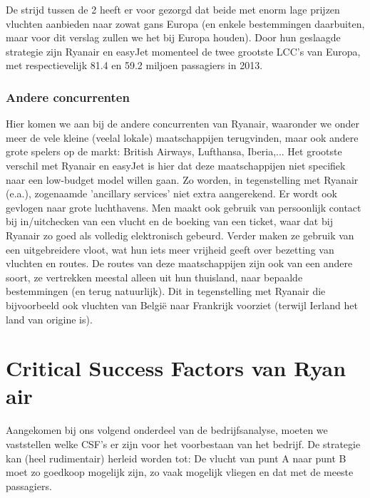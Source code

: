 \documentclass{article}
\begin{document}
De strijd tussen de 2 heeft er voor gezorgd dat beide met enorm lage prijzen vluchten aanbieden naar zowat gans Europa (en enkele bestemmingen daarbuiten, maar voor dit verslag zullen we het bij Europa houden). Door hun geslaagde strategie zijn Ryanair en easyJet momenteel de twee grootste LCC's van Europa, met respectievelijk 81.4 en 59.2 miljoen passagiers in 2013.

\section{Andere concurrenten}

Hier komen we aan bij de andere concurrenten van Ryanair, waaronder we onder meer de vele kleine (veelal lokale) maatschappijen terugvinden, maar ook andere grote spelers op de markt: British Airways, Lufthansa, Iberia,... 
Het grootste verschil met Ryanair en easyJet is hier dat deze maatschappijen niet specifiek naar een low-budget model willen gaan. Zo worden, in tegenstelling met Ryanair (e.a.), zogenaamde 'ancillary services' niet extra aangerekend. Er wordt ook gevlogen naar grote luchthavens. Men maakt ook gebruik van persoonlijk contact bij in/uitchecken van een vlucht en de boeking van een ticket, waar dat bij Ryanair zo goed als volledig elektronisch gebeurd. Verder maken ze gebruik van een uitgebreidere vloot, wat hun iets meer vrijheid geeft over bezetting van vluchten en routes.
De routes van deze maatschappijen zijn ook van een andere soort, ze vertrekken meestal alleen uit hun thuisland, naar bepaalde bestemmingen (en terug natuurlijk). Dit in tegenstelling met Ryanair die bijvoorbeeld ook vluchten van Belgi\"e naar Frankrijk voorziet (terwijl Ierland het land van origine is).


\part{Critical Success Factors van Ryan air}

Aangekomen bij ons volgend onderdeel van de bedrijfsanalyse, moeten we vaststellen welke CSF's er zijn voor het voorbestaan van het bedrijf. De strategie kan (heel rudimentair) herleid worden tot: De vlucht van punt A naar punt B moet zo goedkoop mogelijk zijn, zo vaak mogelijk vliegen en dat met de meeste passagiers.
\end{document}

